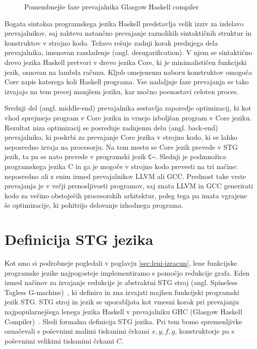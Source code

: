 \begin{figure}[h]
	\caption{Pomembnejše faze prevajalnika Glasgow Haskell compiler}
	\label{fig:shema-ghc}
\end{figure}

Bogata sintaksa programskega jezika Haskell predstavlja velik izziv za izdelavo prevajalnikov, saj zahteva natančno prevajanje raznolikih sintaktičnih struktur in konstruktov v strojno kodo. Težavo rešuje zadnji korak prednjega dela prevajalnika, imenovan razsladenje (angl. desugarification). V njem se sintaktično drevo jezika Haskell pretvori v drevo jezika Core, ki je minimalističen funkcijski jezik, osnovan na lambda računu. Kljub omejenemu naboru konstruktov omogoča Core zapis katerega koli Haskell programa. Vse nadaljnje faze prevajanja se tako izvajajo na tem precej manjšem jeziku, kar močno poenostavi celoten proces.

Srednji del (angl. middle-end) prevajalnika sestavlja zaporedje optimizacij, ki kot vhod sprejmejo program v Core jeziku in vrnejo izboljšan program v Core jeziku. Rezultat niza optimizacij se posreduje zadnjemu delu (angl. back-end) prevajalnika, ki poskrbi za prevajanje Core jezika v strojno kodo, ki se lahko neposredno izvaja na procesorju. Na tem mestu se Core jezik prevede v STG jezik, ta pa se nato prevede v programski jezik \texttt{C--}. Slednji je podmnožica programskega jezika C in ga je mogoče v strojno kodo prevesti na tri načine: neposredno ali z enim izmed prevajalnikov LLVM ali GCC. Prednost take vrste prevajanja je v večji prenosljivosti programov, saj znata LLVM in GCC generirati kodo za večino obstoječih procesorskih arhitektur, poleg tega pa imata vgrajene še optimizacije, ki pohitrijo delovanje izhodnega programa.

\section{Definicija STG jezika}
\label{sec:stg-definicija}

Kot smo si podrobneje pogledali v poglavju \ref{sec:leni-izracun}, lene funkcijske programske jezike najpogosteje implementiramo s pomočjo redukcije grafa. Eden izmed načinov za izvajanje redukcije je abstraktni STG stroj (angl. Spineless Tagless G-machine)~\cite{jones1992implementing, marlow2004making}, ki definira in zna izvajati majhen funkcijski programski jezik STG. STG stroj in jezik se uporabljata kot vmesni korak pri prevajanju najpopularnejšega lenega jezika Haskell v prevajalniku GHC (Glasgow Haskell Compiler)~\cite{GHC}. Sledi formalna definicija STG jezika. Pri tem bomo spremenljivke oz\-na\-če\-va\-li s poševnimi malimi tiskanimi črkami $x, y, f, g$, konstruktorje pa s poševnimi velikimi tiskanimi črkami $C$.

